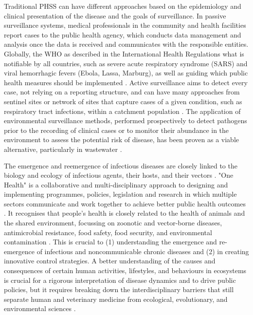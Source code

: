 Traditional \ac{PHSS} can have different approaches based on the epidemiology and clinical presentation of the disease and the goals of surveillance. 
In passive surveillance systems, medical professionals in the community and health facilities report cases to the public health agency, which conducts data management and analysis once the data is received and communicates with the responsible entities. 
Globally, the \ac{WHO} as described in the International Health Regulations what is notifiable by all countries, such as severe acute respiratory syndrome (SARS) and viral hemorrhagic fevers (Ebola, Lassa, Marburg), as well as guiding which public health measures should be implemented \citep{world_health_organization_international_2005}. 
Active surveillance aims to detect every case, not relying on a reporting structure, and can have many approaches from sentinel sites or network of sites that capture cases of a given condition, such as respiratory tract infections, within a catchment population \citep{murray_infectious_2017, melo-cristino_estudo_2006}. 
The application of environmental surveillance methods, performed prospectively to detect pathogens prior to the recording of clinical cases or to monitor their abundance in the environment to assess the potential risk of disease, has been proven as a viable alternative, particularly in wastewater \citep{andrews_environmental_2020, mcweeney_demonstration_1894, baker_combined_2011, larsen_tracking_2020}.  

The emergence and reemergence of infectious diseases are closely linked to the biology and ecology of infectious agents, their hosts, and their vectors \citep{destoumieux-garzon_one_2018}.
"One Health" is a collaborative and multi-disciplinary approach to designing and implementing programmes, policies, legislation and research in which multiple sectors communicate and work together to achieve better public health outcomes \citep{mackenzie_one_2019}. 
It recognises that people's health is closely related to the health of animals and the shared environment, focussing on zoonotic and vector-borne diseases, antimicrobial resistance, food safety, food security, and environmental contamination \citep{rugarabamu_one-health_2021}.
This is crucial to (1) understanding the emergence and re-emergence of infectious and noncommunicable chronic diseases and (2) in creating innovative control strategies.
A better understanding of the causes and consequences of certain human activities, lifestyles, and behaviours in ecosystems is crucial for a rigorous interpretation of disease dynamics and to drive public policies, but it requires breaking down the interdisciplinary barriers that still separate human and veterinary medicine from ecological, evolutionary, and environmental sciences \citep{destoumieux-garzon_one_2018}. 

